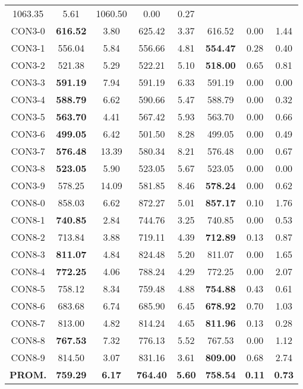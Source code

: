 \begin{table}[h]
\begin{tabular}{c c c c c c c c}
1063.35 & 5.61 & 1060.50 & 0.00
 & 0.27\\CON3-0 & \bf{616.52} & 3.80 & 
625.42 & 3.37 & 616.52 & 0.00
 & 1.44\\CON3-1 & 556.04 & 5.84 & 
556.66 & 4.81 & \bf{554.47} & 
0.28 & 0.40\\CON3-2 & 521.38 & 5.29 & 
522.21 & 5.10 & \bf{518.00} & 
0.65 & 0.81\\CON3-3 & \bf{591.19} & 7.94 & 
591.19 & 6.33 & 591.19 & 0.00
 & 0.00\\
CON3-4 & \bf{588.79} & 6.62 & 
590.66 & 5.47 & 588.79 & 0.00
 & 0.32\\CON3-5 & \bf{563.70} & 4.41 & 
567.42 & 5.93 & 563.70 & 0.00
 & 0.66\\CON3-6 & \bf{499.05} & 6.42 & 
501.50 & 8.28 & 499.05 & 0.00
 & 0.49\\CON3-7 & \bf{576.48} & 13.39 & 
580.34 & 8.21 & 576.48 & 0.00
 & 0.67\\CON3-8 & \bf{523.05} & 5.90 & 
523.05 & 5.67 & 523.05 & 0.00
 & 0.00\\
CON3-9 & 578.25 & 14.09 & 
581.85 & 8.46 & \bf{578.24} & 
0.00 & 0.62\\CON8-0 & 858.03 & 6.62 & 
872.27 & 5.01 & \bf{857.17} & 
0.10 & 1.76\\CON8-1 & \bf{740.85} & 2.84 & 
744.76 & 3.25 & 740.85 & 0.00
 & 0.53\\CON8-2 & 713.84 & 3.88 & 
719.11 & 4.39 & \bf{712.89} & 
0.13 & 0.87\\CON8-3 & \bf{811.07} & 4.84 & 
824.48 & 5.20 & 811.07 & 0.00
 & 1.65\\CON8-4 & \bf{772.25} & 4.06 & 
788.24 & 4.29 & 772.25 & 0.00
 & 2.07\\CON8-5 & 758.12 & 8.34 & 
759.48 & 4.88 & \bf{754.88} & 
0.43 & 0.61\\CON8-6 & 683.68 & 6.74 & 
685.90 & 6.45 & \bf{678.92} & 
0.70 & 1.03\\CON8-7 & 813.00 & 4.82 & 
814.24 & 4.65 & \bf{811.96} & 
0.13 & 0.28\\CON8-8 & \bf{767.53} & 7.32 & 
776.13 & 5.52 & 767.53 & 0.00
 & 1.12\\CON8-9 & 814.50 & 3.07 & 
831.16 & 3.61 & \bf{809.00} & 
0.68 & 2.74\\\bf{PROM.} & 
\bf{759.29} & \bf{6.17} & \bf{764.40} & \bf{5.60} & \bf{758.54} & \bf{0.11} & \bf{0.73}\\[1ex]\hline
\end{tabular}
\label{table:nonlin}
\end{table}
